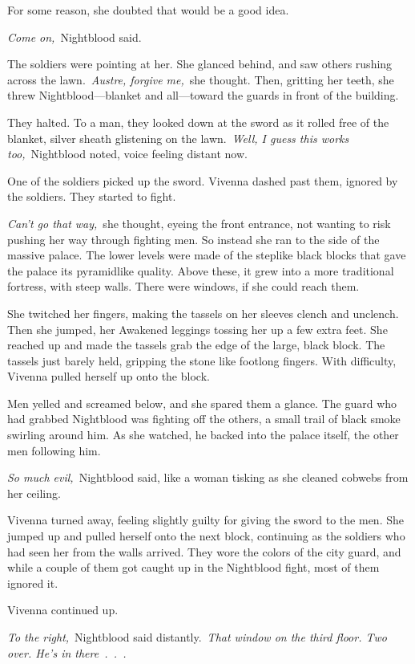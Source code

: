 For some reason, she doubted that would be a good idea.

\textit{Come on,}~Nightblood said.

The soldiers were pointing at her. She glanced behind, and saw others rushing across the lawn.~\textit{Austre, forgive me,}~she thought. Then, gritting her teeth, she threw Nightblood—blanket and all—toward the guards in front of the building.

They halted. To a man, they looked down at the sword as it rolled free of the blanket, silver sheath glistening on the lawn.~\textit{Well, I guess this works too,}~Nightblood noted, voice feeling distant now.

One of the soldiers picked up the sword. Vivenna dashed past them, ignored by the soldiers. They started to fight.

\textit{Can’t go that way,}~she thought, eyeing the front entrance, not wanting to risk pushing her way through fighting men. So instead she ran to the side of the massive palace. The lower levels were made of the steplike black blocks that gave the palace its pyramidlike quality. Above these, it grew into a more traditional fortress, with steep walls. There were windows, if she could reach them.

She twitched her fingers, making the tassels on her sleeves clench and unclench. Then she jumped, her Awakened leggings tossing her up a few extra feet. She reached up and made the tassels grab the edge of the large, black block. The tassels just barely held, gripping the stone like footlong fingers. With difficulty, Vivenna pulled herself up onto the block.

Men yelled and screamed below, and she spared them a glance. The guard who had grabbed Nightblood was fighting off the others, a small trail of black smoke swirling around him. As she watched, he backed into the palace itself, the other men following him.

\textit{So much evil,}~Nightblood said, like a woman tisking as she cleaned cobwebs from her ceiling.

Vivenna turned away, feeling slightly guilty for giving the sword to the men. She jumped up and pulled herself onto the next block, continuing as the soldiers who had seen her from the walls arrived. They wore the colors of the city guard, and while a couple of them got caught up in the Nightblood fight, most of them ignored it.

Vivenna continued up.

\textit{To the right,}~Nightblood said distantly.~\textit{That window on the third floor. Two over. He’s in there~.~.~.}

